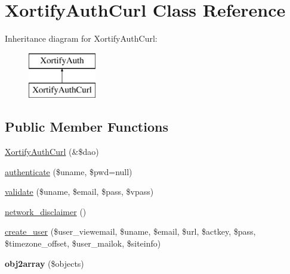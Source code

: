 \hypertarget{class_xortify_auth_curl}{\section{Xortify\-Auth\-Curl Class Reference}
\label{class_xortify_auth_curl}
}
Inheritance diagram for Xortify\-Auth\-Curl\-:\begin{figure}[H]
\begin{center}
\leavevmode
\includegraphics[height=2.000000cm]{class_xortify_auth_curl}
\end{center}
\end{figure}
\subsection*{Public Member Functions}
\begin{DoxyCompactItemize}
\item 
\hyperlink{class_xortify_auth_curl_ac436cd767522f87f84954f85320a9d08}{Xortify\-Auth\-Curl} (\&\$dao)
\item 
\hyperlink{class_xortify_auth_curl_ae10c57fd832a8c993bcbe8551aa0cc33}{authenticate} (\$uname, \$pwd=null)
\item 
\hyperlink{class_xortify_auth_curl_a3caa1e55b266a3ddb802e100d6acee62}{validate} (\$uname, \$email, \$pass, \$vpass)
\item 
\hyperlink{class_xortify_auth_curl_a3125212e375aabcbfa91d53c9e1e9dc4}{network\-\_\-disclaimer} ()
\item 
\hyperlink{class_xortify_auth_curl_a2b874fefae21fee395945e4d051ed296}{create\-\_\-user} (\$user\-\_\-viewemail, \$uname, \$email, \$url, \$actkey, \$pass, \$timezone\-\_\-offset, \$user\-\_\-mailok, \$siteinfo)
\item 
\hypertarget{class_xortify_auth_curl_a4e66bc68a953effdcf252e7d2d5e94b3}{{\bfseries obj2array} (\$objects)}\label{class_xortify_auth_curl_a4e66bc68a953effdcf252e7d2d5e94b3}

\end{DoxyCompactItemize}
